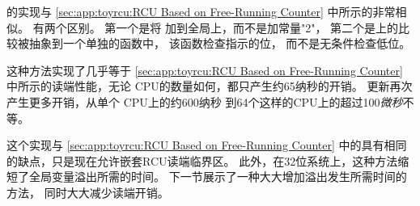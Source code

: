\begin{fcvref}
的实现与
\cref{sec:app:toyrcu:RCU Based on Free-Running Counter}
中所示的非常相似。
有两个区别。
第一个是将
加到全局上，而不是加常量"2"，
第二个是上的比较被抽象到一个单独的函数中，
该函数检查指示的位，
而不是无条件检查低位。
\end{fcvref}

这种方法实现了几乎等于
\cref{sec:app:toyrcu:RCU Based on Free-Running Counter}
中所示的读端性能，无论 CPU的数量如何，都只产生约65纳秒的开销。
更新再次产生更多开销，从单个 CPU上的约600纳秒
到64个这样的CPU上的超过100\emph{微秒}不等。

\QuickQuizEnd

这个实现与
\cref{sec:app:toyrcu:RCU Based on Free-Running Counter}
中的具有相同的缺点，只是现在允许嵌套RCU读端临界区。
此外，在32位系统上，这种方法缩短了全局变量溢出所需的时间。
下一节展示了一种大大增加溢出发生所需时间的方法，
同时大大减少读端开销。

